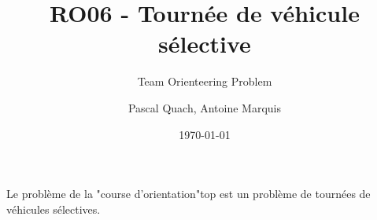 \documentclass[a4paper]{scrartcl}
\title{RO06 - Tournée de véhicule sélective}
\subtitle{Team Orienteering Problem}
\author{Pascal Quach, Antoine Marquis}
\date{\today}
\begin{document}
\maketitle

Le problème de la "course d'orientation"\textemdash \gls{top} \textemdash est
un problème de tournées de véhicules sélectives.


\printnoidxglossary[type=acronym]
\end{document}
